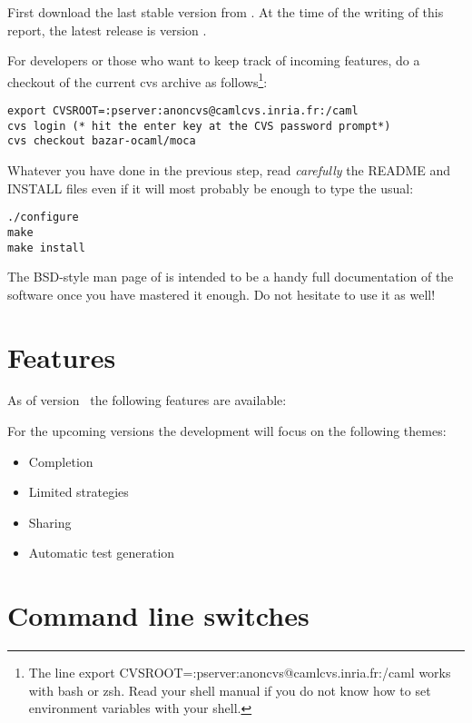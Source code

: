 First download the last stable version from \mocaweb. At the time of
the writing of this report, the latest release is version \vnumber.

For developers or those who want to keep track of incoming features,
 do a checkout of the current cvs archive as follows\footnote{The line {\sf export
    CVSROOT=:pserver:anoncvs@camlcvs.inria.fr:/caml} works with {\sf
    bash} or {\sf zsh}. Read your shell manual if you do not know how
  to set environment variables with your shell.}:

\begin{verbatim}
export CVSROOT=:pserver:anoncvs@camlcvs.inria.fr:/caml
cvs login (* hit the enter key at the CVS password prompt*)
cvs checkout bazar-ocaml/moca
\end{verbatim}

Whatever you have done in the previous step, read {\em carefully} the
README and INSTALL files even if it will most probably be enough to
type the usual: 
\begin{verbatim}
./configure
make
make install
\end{verbatim}

The BSD-style man page of \moca is intended to be a handy full documentation of
the software once you have mastered it enough. Do not hesitate to use
it as well!

\section{Features}
\label{sec:features}

As of version \vnumber\ the following features are available:

For the upcoming versions the development will focus on the following themes:
\begin{itemize}
\item Completion
\item Limited strategies
\item Sharing
\item Automatic test generation
\end{itemize}


\section{Command line switches}
\label{sec:clswitches}

